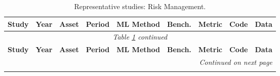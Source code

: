 \begin{longtable}{p{2.4cm} p{0.6cm} p{1.0cm} p{1.0cm} p{2.0cm} p{1.5cm} p{1.3cm} p{0.7cm} p{1.3cm}}
\caption{Representative studies: Risk Management.}\label{tab:master_risk} \\
\toprule
\textbf{Study} & \textbf{Year} & \textbf{Asset} & \textbf{Period} & \textbf{ML Method} & \textbf{Bench.} & \textbf{Metric} & \textbf{Code} & \textbf{Data} \\
\midrule
\endfirsthead
\multicolumn{9}{c}{\textit{Table \ref{tab:master_risk} continued}} \\
\toprule
\textbf{Study} & \textbf{Year} & \textbf{Asset} & \textbf{Period} & \textbf{ML Method} & \textbf{Bench.} & \textbf{Metric} & \textbf{Code} & \textbf{Data} \\
\midrule
\endhead
\midrule
\multicolumn{9}{r}{\textit{Continued on next page}} \\
\endfoot
\bottomrule
\endlastfoot


\end{longtable}
